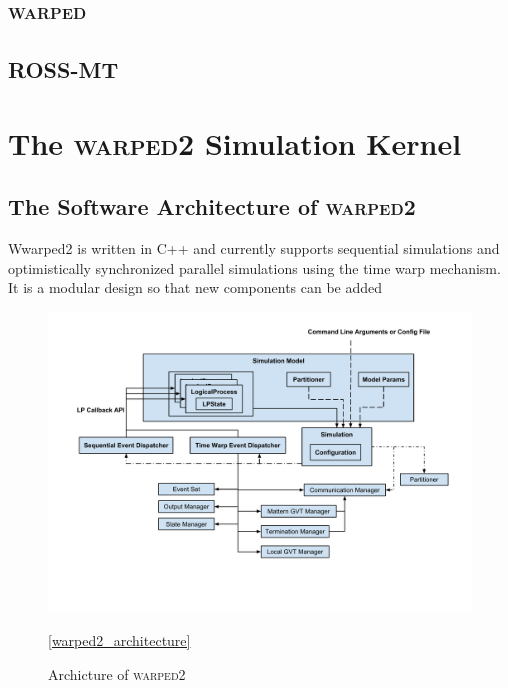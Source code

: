\documentclass[11pt]{book}
\begin{document}

\section{\textsc{warped}}


\section{ROSS-MT}


\chapter{The \textsc{warped2} Simulation Kernel}\label{warped2_overview}



\section{The Software Architecture of \textsc{warped2}}

Wwarped2 is written in C++ and currently supports sequential simulations and optimistically
synchronized parallel simulations using the time warp mechanism. It is a modular design so that
new components can be added 

\begin{figure}
  \centering
  \includegraphics[width=\textwidth]{figs/warped2.pdf}
  \caption{Archicture of \textsc{warped2}}\ref{warped2_architecture}
\end{figure}
\end{document}

